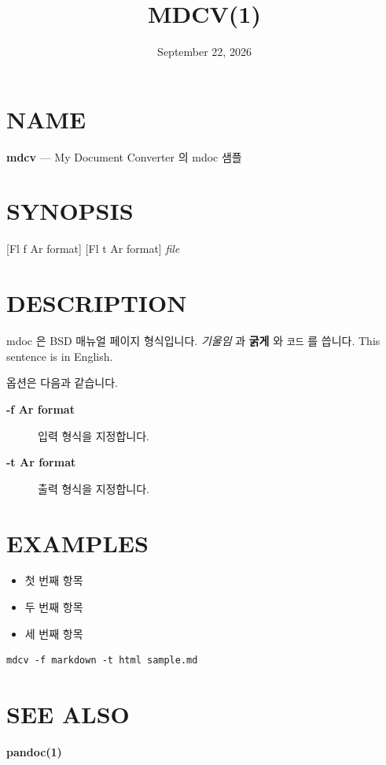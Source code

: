 \documentclass[11pt]{article}
\title{MDCV(1)}
\date{September 22, 2026}
\begin{document}
\maketitle

\section*{NAME}\label{name}

\textbf{mdcv} --- My Document Converter 의 mdoc 샘플

\section*{SYNOPSIS}\label{synopsis}

\textbf{} [Fl f Ar format] [Fl t Ar format] \emph{file}

\section*{DESCRIPTION}\label{description}

mdoc 은 BSD 매뉴얼 페이지 형식입니다. \emph{기울임} 과 \textbf{굵게} 와 \verb|코드| 를 씁니다.
This sentence is in English.

옵션은 다음과 같습니다.

\begin{description}
\item[\textbf{-f Ar format}] 입력 형식을 지정합니다.
\item[\textbf{-t Ar format}] 출력 형식을 지정합니다.
\end{description}

\section*{EXAMPLES}\label{examples}

\begin{itemize}
\item 첫 번째 항목
\item 두 번째 항목
\item 세 번째 항목
\end{itemize}

\begin{verbatim}
mdcv -f markdown -t html sample.md
\end{verbatim}

\section*{SEE ALSO}\label{see-also}

\textbf{pandoc(1)}
\end{document}
